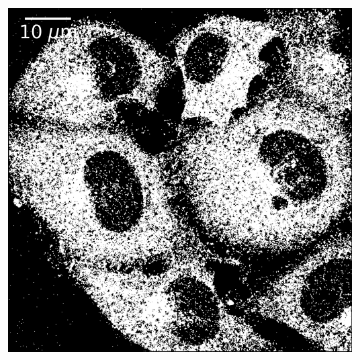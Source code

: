\begin{figure}[htbp]
    \begin{subfigure}{0.49\textwidth}
        \includegraphics[width=\textwidth]{figures/clathrin_image8.png}
        \caption{}
    \end{subfigure}
    \begin{subfigure}{0.49\textwidth}

\end{subfigure}
\end{figure}
